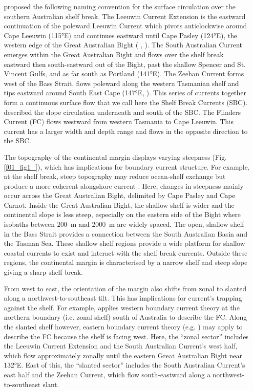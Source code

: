 \documentclass[preprint,3p,review,12pt]{elsarticle}
\begin{document}
\citet{Ridgway2004} proposed the following naming convention for the surface circulation over the southern Australian shelf break. 
The Leeuwin Current Extension is the eastward continuation of the poleward Leeuwin Current which pivots anticlockwise around Cape Leeuwin (\ang{115}E) and continues eastward until Cape Pasley (\ang{124}E), the western edge of the Great Australian Bight (\citeauthor{Ridgway2004} \citeyear{Ridgway2004}, \citeauthor{Batteen2007} \citeyear{Batteen2007}). 
The South Australian Current emerges within the Great Australian Bight and flows over the shelf break eastward then south-eastward out of the Bight, past the shallow Spencer and St.\,Vincent Gulfs, and as far south as Portland (\ang{141}E).
The Zeehan Current forms west of the Bass Strait, flows poleward along the western Tasmanian shelf and tips eastward around South East Cape (\ang{147}E, \citeauthor{Oliver2018b} \citeyear{Oliver2018b}).
This series of currents together form a continuous surface flow that we call here the Shelf Break Currents (SBC).
\citet{Middleton2002} described the slope circulation underneath and south of the SBC. The Flinders Current (FC) flows westward from western Tasmania to Cape Leeuwin. This current has a larger width and depth range and flows in the opposite direction to the SBC.

The topography of the continental margin displays varying steepness (Fig.\,\ref{f01_fig1_}), which has implications for boundary current structure.
For example, at the shelf break, steep topography may reduce ocean-shelf exchange \citep{Huthnance1995} but produce a more coherent alongshore current \citep{Pennel2012}.
Here, changes in steepness mainly occur across the Great Australian Bight, delimited by Cape Pasley and Cape Carnot. Inside the Great Australian Bight, the shallow shelf is wider and the continental slope is less steep, especially on the eastern side of the Bight where isobaths between \SI{200}{\meter} and \SI{2000}{\meter} are widely spaced. The open, shallow shelf in the Bass Strait provides a connection between the South Australian Basin and the Tasman Sea. These shallow shelf regions provide a wide platform for shallow coastal currents to exist and interact with the shelf break currents. Outside these regions, the continental margin is characterised by a narrow shelf and steep slope giving a sharp shelf break. 

From west to east, the orientation of the margin also shifts from zonal to slanted along a northwest-to-southeast tilt. This has implications for current's trapping against the shelf. For example, \citet{Middleton2002} applies western boundary current theory at the northern boundary (i.e. zonal shelf) south of Australia to describe the FC. Along the slanted shelf however, eastern boundary current theory (e.g.  \citeauthor{McCreary1993}  \citeyear{McCreary1993}) may apply to describe the FC because the shelf is facing west. Here, the ``zonal sector'' includes the Leeuwin Current Extension and the South Australian Current's west half, which flow approximately zonally until the eastern Great Australian Bight near \ang{132}E. East of this, the ``slanted sector'' includes the South Australian Current's east half and the Zeehan Current, which flow south-eastward along a northwest-to-southeast slant.
\end{document}
